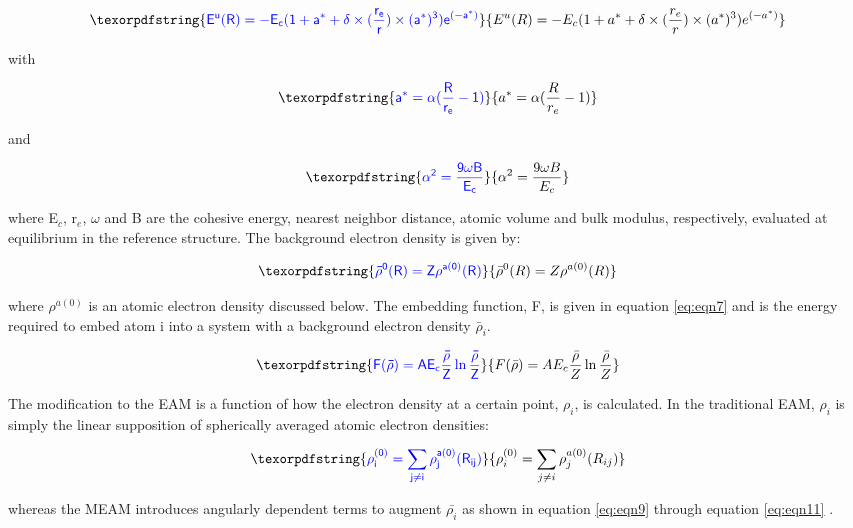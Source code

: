 \documentclass[review]{elsarticle}
\providecommand{\DIFaddtex}[1]{{\protect\color{blue} \sf #1}} %
\providecommand{\DIFadd}[1]{\texorpdfstring{\DIFaddtex{#1}}{#1}} %
\begin{document}
\begin{equation}
\DIFadd{\label{eq:eqn3}
 E^{u}(R) = -E_{c} (1 + a^{*} + \delta \times (\frac{r_{e}}{r}) \times (a^{*})^{3}) e^{(-a^{*})}
 }\end{equation}

\DIFadd{with
}

\begin{equation}
\DIFadd{\label{eq:eqn4}
a^{*} = \alpha ( \frac{R}{r_{e}} - 1)
}\end{equation}

\DIFadd{and
}

\begin{equation}
\DIFadd{\label{eq:eqn5}
\alpha^{2} = \frac{9\omega B}{E_{c}}
}\end{equation}

\DIFadd{where E$_{c}$, r$_{e}$, $\omega$ and B are the cohesive energy, nearest neighbor distance, atomic volume and bulk modulus, respectively, evaluated at equilibrium in the reference structure.  The background electron density is given by:
}

\begin{equation}
\DIFadd{\label{eq:eqn6}
\bar{\rho}^{0}(R) = Z \rho^{a(0)} (R)
}\end{equation}

\DIFadd{where $\rho^{a(0)}$  is an atomic electron density discussed below.  The embedding function, F, is given in equation \ref{eq:eqn7} and is the energy required to embed atom i into a system with a background electron density $\bar{\rho}_{i}$.  
}

\begin{equation}
\DIFadd{\label{eq:eqn7}
F(\bar{\rho}) = AE_{c} \frac{\bar{\rho}}{Z}\ln\frac{\bar{\rho}}{Z}
}\end{equation}

\DIFadd{The modification to the EAM is a function of how the electron density at a certain point, $\rho_{i}$, is calculated.  In the traditional EAM, $\rho_{i}$ is simply the linear supposition of spherically averaged atomic electron densities:
}

\begin{equation}
\DIFadd{\label{eq:eqn8}
\rho_{i}^{(0)} = \sum_{j \neq i} \rho_{j}^{a(0)} (R_{ij})
}\end{equation}

\DIFadd{whereas the MEAM introduces angularly dependent terms to augment $\bar{\rho_{i}}$ as shown in equation \ref{eq:eqn9} through equation \ref{eq:eqn11} \cite{baskes2000, baskes1987}.  
}
\end{document}
